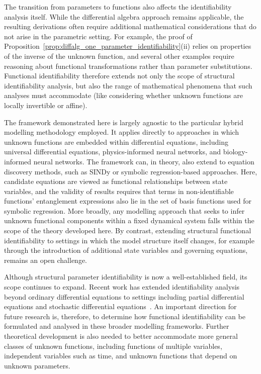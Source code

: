 \documentclass{article}
\theoremstyle{plain}
\theoremstyle{definition}
\begin{document}
{The transition from parameters to functions also affects the identifiability analysis itself. While the differential algebra approach remains applicable, the resulting derivations often require additional mathematical considerations that do not arise in the parametric setting. For example, the proof of Proposition~\ref{prop:diffalg_one_parameter_identifiability}(ii) relies on properties of the inverse of the unknown function, and several other examples require reasoning about functional transformations rather than parameter substitutions. Functional identifiability therefore extends not only the scope of structural identifiability analysis, but also the range of mathematical phenomena that such analyses must accommodate (like considering whether unknown functions are locally invertible or affine).

The framework demonstrated here is largely agnostic to the particular hybrid modelling methodology employed. It applies directly to approaches in which unknown functions are embedded within differential equations, including universal differential equations, physics-informed neural networks, and biology-informed neural networks. The framework can, in theory, also extend to equation discovery methods, such as SINDy or symbolic regression-based approaches. Here, candidate equations are viewed as functional relationships between state variables, and the validity of results requires that terms in non-identifiable functions' entanglement expressions also lie in the set of basis functions used for symbolic regression. More broadly, any modelling approach that seeks to infer unknown functional components within a fixed dynamical system falls within the scope of the theory developed here. By contrast, extending structural functional identifiability to settings in which the model structure itself changes, for example through the introduction of additional state variables and governing equations, remains an open challenge.

Although structural parameter identifiability is now a well-established field, its scope continues to expand. Recent work has extended identifiability analysis beyond ordinary differential equations to settings including partial differential equations and stochastic differential equations~\cite{renardy_structural_2022,browning_structural_2024,byrne_algebraic_2025,browning_exact_2025}. An important direction for future research is, therefore, to determine how functional identifiability can be formulated and analysed in these broader modelling frameworks. Further theoretical development is also needed to better accommodate more general classes of unknown functions, including functions of multiple variables, independent variables such as time, and unknown functions that depend on unknown parameters.

}
\end{document}

